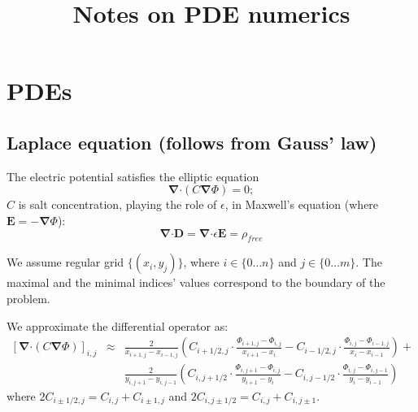 \documentclass[11pt]{article}
\title{Notes on PDE numerics}
\newcommand\eps \epsilon
\newcommand{\vect}[1]{\ensuremath{\mathbf{#1}}}
\providecommand\bnabla{\boldsymbol{\nabla}}
\providecommand\bcdot{\boldsymbol{\cdot}}
\begin{document}
\maketitle
\section{PDEs}
\subsection{Laplace equation (follows from Gauss' law)}
The electric potential satisfies the elliptic equation
\begin{equation}
	\bnabla \bcdot (C \bnabla \varPhi) = 0; \label{Phi eqn}
\end{equation}
$C$ is salt concentration, playing the role of $\eps$,
in Maxwell's equation (where $\vect{E} = -\bnabla \varPhi$):
\begin{equation}
\bnabla \bcdot \vect{D} = \bnabla \bcdot \eps \vect{E} = \rho_{free}
\end{equation}

We assume regular grid $\{(x_i, y_j)\}$,
where $i\in\{0 \ldots n\}$ and $j\in\{0 \ldots m\}$. The maximal and the
minimal indices' values correspond to the boundary of the problem.

We approximate the differential operator as:
\begin{eqnarray}
\left[ \bnabla \bcdot (C \bnabla \varPhi) \right]_{i,j}
&\approx &\frac{2}{x_{i+1,j} - x_{i-1,j}} \left(
C_{i+1/2,j} \cdot \frac{\varPhi_{i+1,j}-\varPhi_{i,j}}{x_{i+1}-x_{i}} -
C_{i-1/2,j} \cdot \frac{\varPhi_{i,j}-\varPhi_{i-1,j}}{x_{i}-x_{i-1}}
\right) + \\
&&\frac{2}{y_{i,j+1} - y_{i,j-1}} \left(C_{i,j+1/2} \cdot \frac{\varPhi_{i,j+1}-\varPhi_{i,j}}{y_{i+1}-y_{i}} -
C_{i,j-1/2} \cdot \frac{\varPhi_{i,j}-\varPhi_{i,j-1}}{y_{i}-y_{i-1}}
\right)
\end{eqnarray}
where $2C_{i\pm 1/2,j} = C_{i,j} + C_{i\pm 1,j}$ and
$2C_{i,j\pm 1/2} = C_{i,j} + C_{i,j\pm 1}$.
\end{document}
